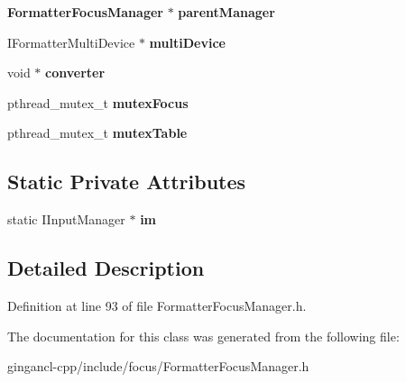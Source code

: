 \begin{CompactItemize}
\item 
{\bf FormatterFocusManager} $\ast$ {\bf parentManager}\label{classbr_1_1pucrio_1_1telemidia_1_1ginga_1_1ncl_1_1focus_1_1FormatterFocusManager_968fa68deeb712c364e142afd469957b}

\item 
IFormatterMultiDevice $\ast$ {\bf multiDevice}\label{classbr_1_1pucrio_1_1telemidia_1_1ginga_1_1ncl_1_1focus_1_1FormatterFocusManager_5887431c9649d5e32ce5c1dd04455959}

\item 
void $\ast$ {\bf converter}\label{classbr_1_1pucrio_1_1telemidia_1_1ginga_1_1ncl_1_1focus_1_1FormatterFocusManager_2b552364a1de2f68b29a7fb4f0075f15}

\item 
pthread\_\-mutex\_\-t {\bf mutexFocus}\label{classbr_1_1pucrio_1_1telemidia_1_1ginga_1_1ncl_1_1focus_1_1FormatterFocusManager_6f8941f2292a992a0474a8f0707fb82a}

\item 
pthread\_\-mutex\_\-t {\bf mutexTable}\label{classbr_1_1pucrio_1_1telemidia_1_1ginga_1_1ncl_1_1focus_1_1FormatterFocusManager_c49695691836dad1f890543697522d80}

\end{CompactItemize}
\subsection*{Static Private Attributes}
\begin{CompactItemize}
\item 
static IInputManager $\ast$ {\bf im}\label{classbr_1_1pucrio_1_1telemidia_1_1ginga_1_1ncl_1_1focus_1_1FormatterFocusManager_1a7a3c6296297c71a86bc018607fdcfe}

\end{CompactItemize}


\subsection{Detailed Description}




Definition at line 93 of file FormatterFocusManager.h.

The documentation for this class was generated from the following file:\begin{CompactItemize}
\item 
gingancl-cpp/include/focus/FormatterFocusManager.h\end{CompactItemize}
